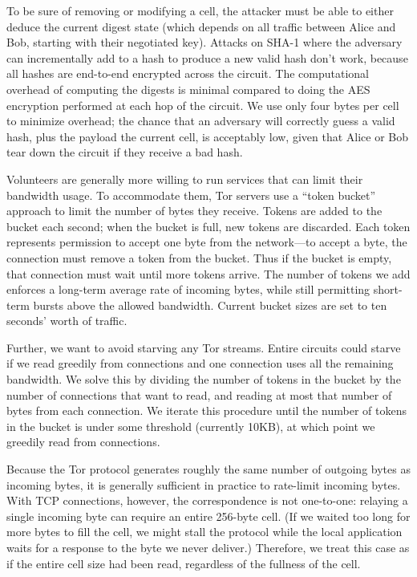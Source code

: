 \documentclass[times,10pt,twocolumn]{article}
\begin{document}
To be sure of removing or modifying a cell, the attacker must be able
to either deduce the current digest state (which depends on all
traffic between Alice and Bob, starting with their negotiated key).
Attacks on SHA-1 where the adversary can incrementally add to a hash
to produce a new valid hash don't work, because all hashes are
end-to-end encrypted across the circuit.  The computational overhead
of computing the digests is minimal compared to doing the AES
encryption performed at each hop of the circuit. We use only four
bytes per cell to minimize overhead; the chance that an adversary will
correctly guess a valid hash, plus the payload the current cell, is
acceptably low, given that Alice or Bob tear down the circuit if they
receive a bad hash.


Volunteers are generally more willing to run services that can limit
their bandwidth usage.  To accommodate them, Tor servers use a ``token
bucket'' approach to limit the number of bytes they
receive. Tokens are added to the bucket each second; when the bucket is
full, new tokens are discarded. Each token represents permission to
accept one byte from the network---to accept a byte, the connection
must remove a token from the bucket. Thus if the bucket is empty, that
connection must wait until more tokens arrive. The number of tokens we
add enforces a long-term average rate of incoming bytes, while still
permitting short-term bursts above the allowed bandwidth. Current bucket
sizes are set to ten seconds' worth of traffic.

Further, we want to avoid starving any Tor streams. Entire circuits
could starve if we read greedily from connections and one connection
uses all the remaining bandwidth. We solve this by dividing the number
of tokens in the bucket by the number of connections that want to read,
and reading at most that number of bytes from each connection. We iterate
this procedure until the number of tokens in the bucket is under some
threshold (currently 10KB), at which point we greedily read from connections.

Because the Tor protocol generates roughly the same number of outgoing
bytes as incoming bytes, it is generally sufficient in practice to rate-limit
incoming bytes.
With TCP connections, however, the correspondence is not one-to-one:
relaying a single incoming byte can require an entire 256-byte cell.
(If we waited too long for more bytes to fill the cell, we might stall
the protocol while the local application waits for a response to the
byte we never deliver.) Therefore, we treat this case as if the entire
cell size had been read, regardless of the fullness of the cell.
\end{document}
